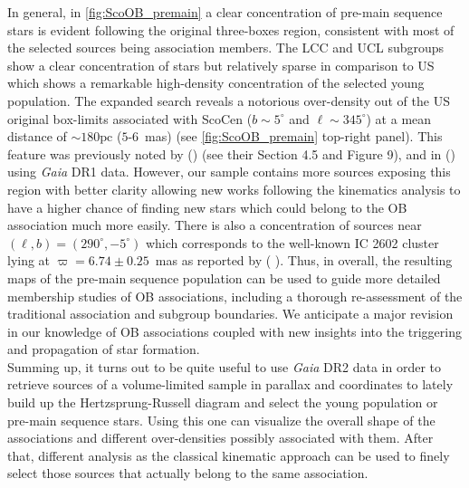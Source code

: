 In general, in \autoref{fig:ScoOB_premain} a clear concentration of pre-main sequence stars is evident following the original three-boxes region, consistent with most of the selected sources being association members. The LCC and UCL subgroups show a clear concentration of stars but relatively sparse in comparison to US which shows a remarkable high-density concentration of the selected young population. The expanded search reveals a notorious over-density out of the US original box-limits associated with ScoCen ($b\sim5^\circ$ and $\ell\sim345^\circ$) at a mean distance of $\sim180\mathrm{pc}$ ($5$-$6$~mas) (see \autoref{fig:ScoOB_premain} top-right panel). This feature was previously noted by  (\citeyear{1999AJ....117..354D}) (see their Section 4.5 and Figure 9), and in  (\citeyear{2016MNRAS.461..794P}) using \textit{Gaia} DR1 data. However, our sample contains more sources exposing this region with better clarity allowing new works following the kinematics analysis to have a higher chance of finding new stars which could belong to the OB association much more easily. There is also a concentration of sources near $(\ell,b)=(290^\circ,-5^\circ)$ which corresponds to the well-known IC 2602 cluster lying at $\varpi = 6.74 \pm 0.25$~mas as reported by ( \citeyear{vanLeeuwen17}). Thus, in overall, the resulting maps of the pre-main sequence population can be used to guide more detailed membership studies of OB associations, including a thorough re-assessment of the traditional association and subgroup boundaries. We anticipate a major revision in our knowledge of OB associations coupled with new insights into the triggering and propagation of star formation.\\

Summing up, it turns out to be quite useful to use \textit{Gaia} DR2 data in order to retrieve sources of a volume-limited sample in parallax and coordinates to lately build up the Hertzsprung-Russell diagram and select the young population or pre-main sequence stars. Using this one can visualize the overall shape of the associations and different over-densities possibly associated with them. After that, different analysis as the classical kinematic approach can be used to finely select those sources that actually belong to the same association.  